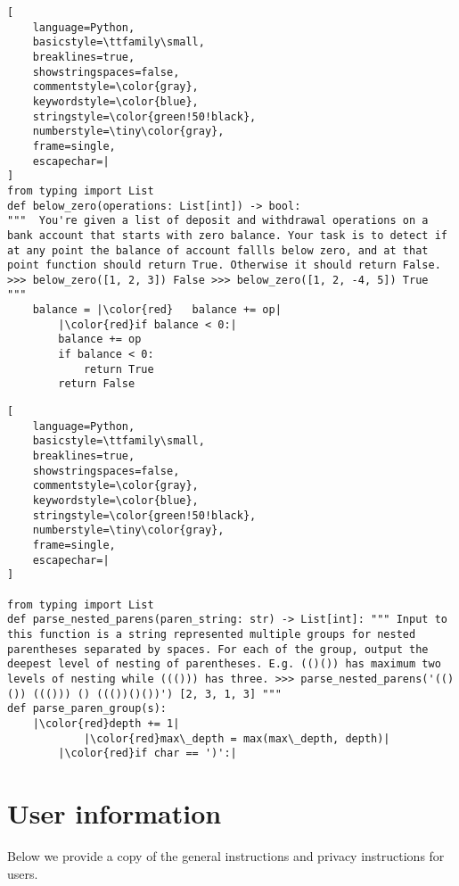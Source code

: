 \begin{minipage}{0.9\textwidth}
\begin{lstlisting}[
    language=Python,
    basicstyle=\ttfamily\small,
    breaklines=true,
    showstringspaces=false,
    commentstyle=\color{gray},
    keywordstyle=\color{blue},
    stringstyle=\color{green!50!black},
    numberstyle=\tiny\color{gray},
    frame=single,
    escapechar=|
]
from typing import List 
def below_zero(operations: List[int]) -> bool: 
"""  You're given a list of deposit and withdrawal operations on a bank account that starts with zero balance. Your task is to detect if at any point the balance of account fallls below zero, and at that point function should return True. Otherwise it should return False. >>> below_zero([1, 2, 3]) False >>> below_zero([1, 2, -4, 5]) True  """ 
    balance = |\color{red}   balance += op|
        |\color{red}if balance < 0:|
        balance += op 
        if balance < 0: 
            return True 
        return False
\end{lstlisting}
\end{minipage}


\begin{minipage}{0.9\textwidth}
\begin{lstlisting}[
    language=Python,
    basicstyle=\ttfamily\small,
    breaklines=true,
    showstringspaces=false,
    commentstyle=\color{gray},
    keywordstyle=\color{blue},
    stringstyle=\color{green!50!black},
    numberstyle=\tiny\color{gray},
    frame=single,
    escapechar=|
]

from typing import List 
def parse_nested_parens(paren_string: str) -> List[int]: """ Input to this function is a string represented multiple groups for nested parentheses separated by spaces. For each of the group, output the deepest level of nesting of parentheses. E.g. (()()) has maximum two levels of nesting while ((())) has three. >>> parse_nested_parens('(()()) ((())) () ((())()())') [2, 3, 1, 3] """ 
def parse_paren_group(s):
    |\color{red}depth += 1|
            |\color{red}max\_depth = max(max\_depth, depth)|
        |\color{red}if char == ')':|
\end{lstlisting}
\end{minipage}


\section{User information}\label{appendix:data_release}

Below we provide a copy of the general instructions and privacy instructions for users.


